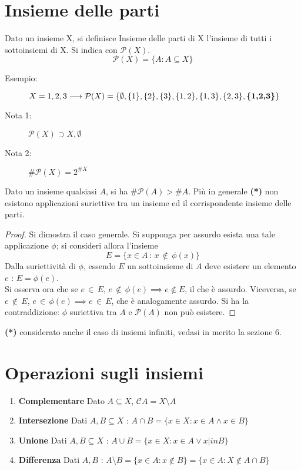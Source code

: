 \documentclass[10pt, oneside]{book}
\theoremstyle{plain}
\begin{document}
\section{Insieme delle parti}
\begin{defin}
Dato un insieme X, si definisce Insieme delle parti di X l'insieme di tutti i sottoinsiemi di X. Si indica con $\mathcal{P}(X)$. \[\mathcal{P}(X) = \{A : A \subseteq X\}\]
\end{defin}
\begin{description} \item[Esempio:] $X = {1,2,3} \longrightarrow \mathcal{P}(X) = \{\emptyset,\{1\},\{2\},\{3\},\{1,2\},\{1,3\},\{2,3\},\textrm{\textbf{\{1,2,3\}}}\}$
\item[Nota 1:] $\mathcal{P}(X) \supset X, \emptyset$
\item[Nota 2:] $\# \mathcal{P}(X) = 2^{\#X}$
\end{description}

\begin{ther}
Dato un insieme qualsiasi $A$, si ha $\#\mathcal{P}(A) > \# A$. Più in generale \textbf{(*)} non esistono applicazioni suriettive tra un insieme ed il corrispondente insieme delle parti.
\end{ther}
\begin{proof}
Si dimostra il caso generale. Si supponga per assurdo esista una tale applicazione $\phi$; si consideri allora l'insieme
\[E = \{x \in A \, : \, x \, \notin \, \phi(x)\}\]
Dalla suriettività di $\phi$, essendo $E$ un sottoinsieme di $A$ deve esistere un elemento $e$ : $E = \phi(e)$.
\\Si osserva ora che se $e \, \in \, E$, $e \, \notin \, \phi(e) \implies e \notin E$, il che è assurdo. Viceversa, se $e \, \notin \, E$, $e \, \in \, \phi(e) \implies e \, \in \, E$, che è analogamente assurdo. Si ha la contraddizione: $\phi$ suriettiva tra $A$ e $\mathcal{P}(A)$ non può esistere.
\end{proof}


\textbf{(*)} considerato anche il caso di insiemi infiniti, vedasi in merito la sezione 6.

\section{Operazioni sugli insiemi}

\begin{enumerate}
\item \textbf{Complementare} Dato $A \subseteq X$, $\mathcal{C}A = X \setminus A$
\item \textbf{Intersezione} Dati $A, B \subseteq X$ : $A \cap B = \{x \in X : x \in A \land x \in B\}$
\item \textbf{Unione} Dati $A, B \subseteq X$ : $A \cup B = \{x \in X : x \in A \lor x |in B\}$
\item \textbf{Differenza} Dati $A, B$ : $A \setminus B = \{x \in A : x \notin B\} = \{x \in A : X \notin A \cap B \}$
\end{enumerate}
\end{document}
